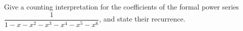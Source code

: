 Give a counting interpretation for the coefficients of the formal power series $\dfrac{1}{1-x-x^2-x^3-x^4-x^5-x^6}$, and state their recurrence.
